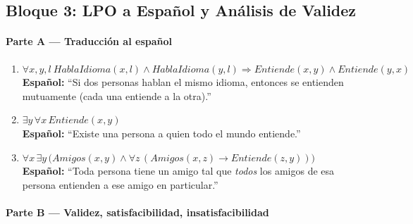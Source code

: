 \subsection{Bloque 3: LPO a Español y Análisis de Validez}

\paragraph{Parte A --- Traducción al español}

\begin{enumerate}
    \item $\forall x,y,l\ HablaIdioma(x,l)\land HablaIdioma(y,l) \Rightarrow Entiende(x,y)\land
    Entiende(y,x)$\\
    \textbf{Español:} ``Si dos personas hablan el mismo idioma, entonces se entienden mutuamente
    (cada una entiende a la otra).''

    \item $\exists y\, \forall x\, Entiende(x,y)$\\
    \textbf{Español:} ``Existe una persona a quien todo el mundo entiende.''

    \item $\forall x\, \exists y\, \big(Amigos(x,y) \land \forall z\,(Amigos(x,z) \to Entiende(z,y))\big)$\\
    \textbf{Español:} ``Toda persona tiene un amigo tal que \emph{todos} los amigos de esa persona
    entienden a ese amigo en particular.''
\end{enumerate}

\paragraph{Parte B --- Validez, satisfacibilidad, insatisfacibilidad}

